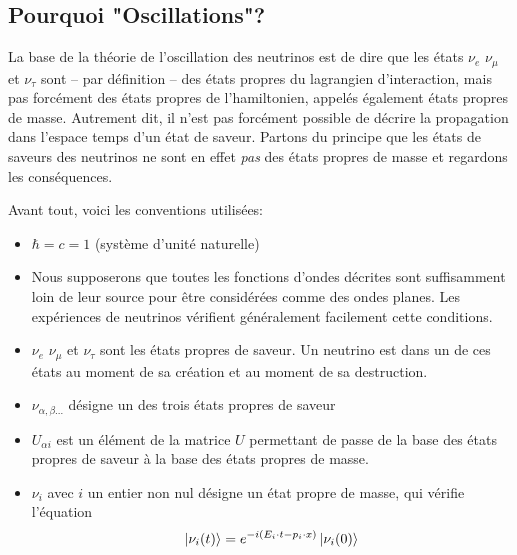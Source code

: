         \subsection{Pourquoi "Oscillations"?}
            La base de la théorie de l'oscillation des neutrinos est de dire que les états $\nu_e$ $\nu_{\mu}$ et $\nu_{\tau}$ sont -- par définition -- des états propres du lagrangien d'interaction, mais pas forcément des états propres de l'hamiltonien, appelés également états propres de masse. Autrement dit, il n'est pas forcément possible de décrire la propagation dans l'espace temps d'un état de saveur. Partons du principe que les états de saveurs des neutrinos ne sont en effet \textit{pas} des états propres de masse et regardons les conséquences. 
            
            Avant tout, voici les conventions utilisées:
            \begin{itemize}
                \item $\hbar = c = 1$ (système d'unité naturelle)
                \item Nous supposerons que toutes les fonctions d'ondes décrites sont suffisamment loin de leur source pour être considérées comme des ondes planes. Les expériences de neutrinos vérifient généralement facilement cette conditions.
                \item $\nu_e$ $\nu_{\mu}$ et $\nu_{\tau}$ sont les états propres de saveur. Un neutrino est dans un de ces états au moment de sa création et au moment de sa destruction.
                \item $\nu_{\alpha,\beta...}$ désigne un des trois états propres de saveur
                \item $U_{\alpha i}$ est un élément de la matrice $U$ permettant de passe de la base des états propres de saveur à la base des états propres de masse.
                \item $\nu_{i}$ avec $i$ un entier non nul désigne un état propre de masse, qui vérifie l'équation
                \begin{equation}
                    \ket{\nu_i(t)} = e^{-i(E_i\cdot t - p_i\cdot x)}\ket{\nu_i(0)}
                \end{equation}
            \end{itemize}
            
